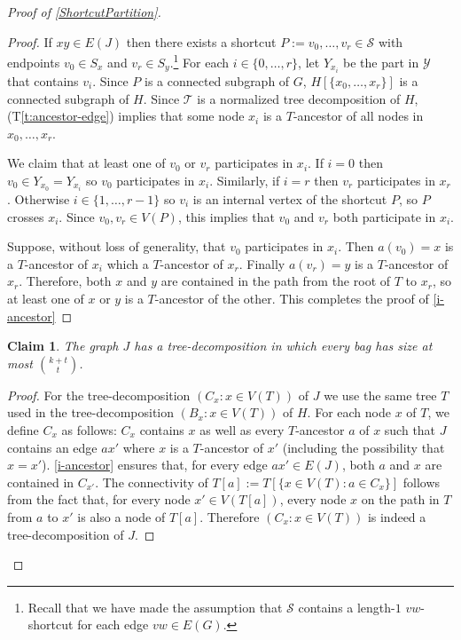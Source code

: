 \documentclass{patmorin}
\theoremstyle{plain}
\newtheorem{clm}{Claim}
\theoremstyle{definition}
\newcommand{\tref}[1]{(T\ref{t:#1})}
\renewcommand{\SS}{\mathcal{S}}
\begin{document}
\begin{proof}[Proof of \cref{ShortcutPartition}]
\begin{proof}
  If $xy\in E(J)$ then there exists a shortcut $P:=v_0,\ldots,v_r\in\SS$ with endpoints $v_0\in S_x$ and $v_r\in S_y$.\footnote{Recall that we have made the assumption that $\SS$ contains a length-$1$ $vw$-shortcut for each edge $vw\in E(G)$.}  For each $i\in\{0,\ldots,r\}$, let $Y_{x_i}$ be the part in $\mathcal{Y}$ that contains $v_i$.  Since $P$ is a connected subgraph of $G$, $H[\{x_0,\ldots,x_r\}]$ is a connected subgraph of $H$.  Since $\mathcal{T}$ is a normalized tree decomposition of $H$, \tref{ancestor-edge} implies that some node $x_i$ is a $T$-ancestor of all nodes in $x_0,\ldots,x_r$.

  We claim that at least one of $v_0$ or $v_r$ participates in $x_i$.  If $i=0$ then $v_0\in Y_{x_0}=Y_{x_i}$ so $v_0$ participates in $x_i$. Similarly, if $i=r$ then $v_r$ participates in $x_r$.  Otherwise $i\in\{1,\ldots,r-1\}$ so $v_i$ is an internal vertex of the shortcut $P$, so $P$ crosses $x_i$.  Since $v_0,v_r\in V(P)$, this implies that $v_0$ and $v_r$ both participate in $x_i$.

  Suppose, without loss of generality, that $v_0$ participates in $x_i$.  Then $a(v_0)=x$ is a $T$-ancestor of $x_i$ which a $T$-ancestor of $x_r$.  Finally $a(v_r)=y$ is a $T$-ancestor of $x_r$.  Therefore, both $x$ and $y$ are contained in the path from the root of $T$ to $x_r$, so at least one of $x$ or $y$ is a $T$-ancestor of the other.  This completes the proof of \cref{i-ancestor}
\end{proof}

\begin{clm}
\label{general-bag-size}
The graph $J$ has a tree-decomposition in which every bag has size at most $\binom{k+t}{t}$.
\end{clm}

\begin{proof}
  For the tree-decomposition $(C_x:x\in V(T))$ of $J$ we use the same tree $T$ used in the tree-decomposition $(B_x:x\in V(T))$ of $H$. For each node $x$ of $T$, we define $C_x$ as follows: $C_x$ contains $x$ as well as every $T$-ancestor $a$ of $x$ such that $J$ contains an edge $ax'$ where $x$ is a $T$-ancestor of $x'$ (including the possibility that $x=x'$).
  \cref{i-ancestor} ensures that, for every edge $ax'\in E(J)$, both $a$ and $x$ are contained in $C_{x'}$.  The connectivity of $T[a]:=T[\{x\in V(T):a\in C_x\}]$ follows from the fact that, for every node $x'\in V(T[a])$, every node $x$ on the path in $T$ from $a$ to  $x'$ is also a node of $T[a]$.  Therefore $(C_x:x\in V(T))$ is indeed a tree-decomposition of $J$.


\end{proof}
\end{proof}
\end{document}
